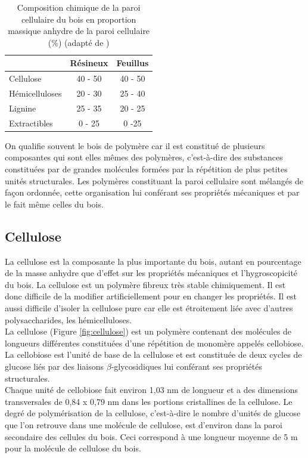 \begin{table}[!h]
\centering
	\begin{tabular}{l c c}
	\hline
	& \bf Résineux & \bf Feuillus \\
	\hline
	\hline
	Cellulose & 40 - 50 & 40 - 50 \\
	Hémicelluloses & 20 - 30 & 25 - 40 \\
	Lignine & 25 - 35 & 20 - 25 \\
	Extractibles &	0 - 25 & 0 -25 \\
	\hline
	\end{tabular}
\caption{Composition chimique de la paroi cellulaire du bois en proportion massique anhydre de la paroi cellulaire (\%) (adapté de \cite{choong1997wood})}
\label{tab:composes}
\end{table}

On qualifie souvent le bois de polymère car il est constitué de plusieurs composantes qui sont elles mêmes des polymères, c'est-à-dire des substances constituées par de grandes molécules formées par la répétition de plus petites unités structurales. Les polymères constituant la paroi cellulaire sont mélangés de façon ordonnée, cette organisation lui conférant ses propriétés mécaniques et par le fait même celles du bois.

\subsection{Cellulose}

La cellulose est la composante la plus importante du bois, autant en pourcentage de la masse anhydre que d'effet sur les propriétés mécaniques et l'hygroscopicité du bois. La cellulose est un polymère fibreux très stable chimiquement. Il est donc difficile de la modifier artificiellement pour en changer les propriétés. Il est aussi difficile d'isoler la cellulose pure car elle est étroitement liée avec d'autres polysaccharides, les hémicelluloses.\\

La cellulose (Figure \ref{fig:cellulose}) est un polymère contenant des molécules de longueurs différentes constituées d'une répétition de monomère appelés cellobiose. La cellobiose est l'unité de base de la cellulose et est constituée de deux cycles de glucose liés par des liaisons $\beta$-glycosidiques lui conférant ses propriétés structurales.\\


Chaque unité de cellobiose fait environ 1,03 nm de longueur et a des dimensions transversales de 0,84 x 0,79 nm dans les portions cristallines de la cellulose. Le degré de polymérisation de la cellulose, c'est-à-dire le nombre d'unités de glucose que l'on retrouve dans une molécule de cellulose, est d'environ  dans la paroi secondaire des cellules du bois. Ceci correspond à une longueur moyenne de 5 \micro m pour la molécule de cellulose du bois.

